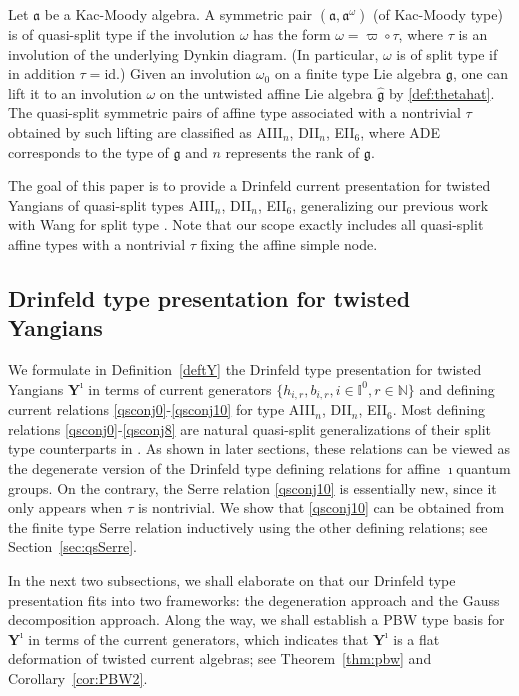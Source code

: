 \documentclass[11pt,reqno]{amsart}
\numberwithin{equation}{section}
\theoremstyle{definition}
\theoremstyle{remark}
\newcommand{\g}{\mathfrak{g}}
\newcommand{\id}{{\mathrm{id}}}
\newcommand{\Yi}{{\mathbf{Y}^\imath}}
\def \H{h}
\def \X{b}
\def \N{\mathbb{N}}
\def \a{\mathfrak{a}}
\begin{document}
Let $\a$ be a Kac-Moody algebra. A symmetric pair $(\a,\a^\omega)$ (of Kac-Moody type) is of quasi-split type  if the involution $\omega$ has the form $\omega=\varpi\circ \tau$, where $\tau$ is an involution of the underlying Dynkin diagram. (In particular, $\omega$ is of split type if in addition $\tau=\id$.) Given an involution $\omega_0$ on a finite type Lie algebra $\g$, one can lift it to an involution $\omega$ on the untwisted affine Lie algebra $\widehat{\g}$ by \eqref{def:thetahat}. The quasi-split symmetric pairs of affine type associated with a nontrivial $\tau$ obtained by such lifting are classified as AIII$_{n}$, DII$_{n}$, EII$_{6}$, where ADE corresponds to the type of $\g$ and $n$ represents the rank of $\g$. 

The goal of this paper is to provide a Drinfeld current presentation for twisted Yangians of quasi-split types AIII$_{n}$, DII$_{n}$,  EII$_{6}$, generalizing our previous work with Wang for split type \cite{KLWZ23a,KLWZ23b}. Note that our scope exactly includes all quasi-split affine types with a nontrivial $\tau$ fixing the affine simple node. 

\subsection{Drinfeld type presentation for twisted Yangians}\label{intro-main}

We formulate in Definition~\ref{deftY} the Drinfeld type presentation for twisted Yangians $\Yi$ in terms of current generators $\{\H_{i,r},\X_{i,r},i\in \mathbb{I}^0,r\in \N\}$ and defining current relations \eqref{qsconj0}-\eqref{qsconj10} for type AIII$_{n}$, DII$_{n}$,  EII$_{6}$. Most defining relations \eqref{qsconj0}-\eqref{qsconj8} are natural quasi-split generalizations of their split type counterparts in \cite[(4.1)-(4.6)]{KLWZ23b}. As shown in later sections, these relations can be viewed as the degenerate version of the Drinfeld type defining relations for affine $\imath$quantum groups. 
On the contrary, the Serre relation \eqref{qsconj10} is essentially new, since it only appears when $\tau$ is nontrivial. We show that \eqref{qsconj10} can be obtained from the finite type Serre relation inductively using the other defining relations; see Section~\ref{sec:qsSerre}. 


In the next two subsections, we shall elaborate on that our Drinfeld type presentation fits into two frameworks: the degeneration approach and the Gauss decomposition approach. Along the way, we shall establish a PBW type basis for $\Yi$ in terms of the current generators, which indicates that $\Yi$ is a flat deformation of twisted current algebras; see Theorem~\ref{thm:pbw} and Corollary~\ref{cor:PBW2}.
\end{document}
